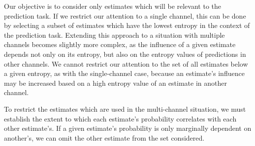 \documentclass[11pt,twocolumn,titlepage]{article}
\begin{document}
Our objective is to consider only estimates which will be relevant to the prediction task.  If we restrict our attention to a single channel, this can be done by selecting a subset of estimates which have the lowest entropy in the context of the prediction task.  Extending this approach to a situation with multiple channels becomes slightly more complex, as the influence of a given estimate depends not only on its entropy, but also on the entropy values of predictions in other channels.  We cannot restrict our attention to the set of all estimates below a given entropy, as with the single-channel case, because an estimate's influence may be increased based on a high entropy value of an estimate in another channel.

To restrict the estimates which are used in the multi-channel situation, we must establish the extent to which each estimate's probability correlates with each other estimate's.  If a given estimate's probability is only marginally dependent on another's, we can omit the other estimate from the set considered.
\end{document}
